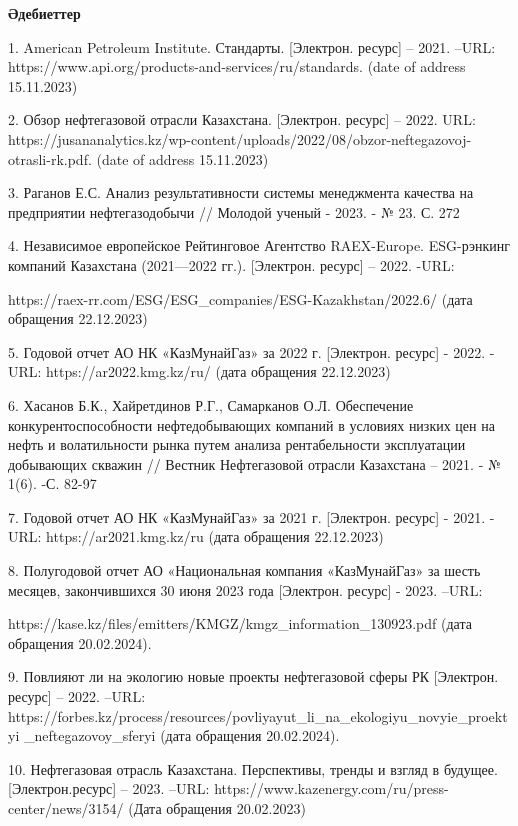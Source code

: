 \begin{center}
{\bfseries Әдебиеттер}
\end{center}

\begin{noparindent}
1. American Petroleum Institute. Стандарты. {[}Электрон. ресурс{]} --
2021. --URL: https://www.api.org/products-and-services/ru/standards.
(date of address 15.11.2023)

2. Обзор нефтегазовой отрасли Казахстана. {[}Электрон. ресурс{]} --
2022. URL:
https://jusananalytics.kz/wp-content/uploads/2022/08/obzor-neftegazovoj-otrasli-rk.pdf.
(date of address 15.11.2023)

3. Раганов Е.С. Анализ результативности системы менеджмента качества на
предприятии нефтегазодобычи // Молодой ученый - 2023. - № 23. С. 272

4. Независимое европейское Рейтинговое Агентство RAEX-Europe.
ESG-рэнкинг компаний Казахстана (2021---2022 гг.). {[}Электрон.
ресурс{]} -- 2022. -URL:

https://raex-rr.com/ESG/ESG\_companies/ESG-Kazakhstan/2022.6/ (дата
обращения 22.12.2023)

5. Годовой отчет АО НК «КазМунайГаз» за 2022 г. {[}Электрон. ресурс{]} -
2022. - URL: https://ar2022.kmg.kz/ru/ (дата обращения 22.12.2023)

6. Хасанов Б.К., Хайретдинов Р.Г., Самарканов О.Л. Обеспечение
конкурентоспособности нефтедобывающих компаний в условиях низких цен на
нефть и волатильности рынка путем анализа рентабельности эксплуатации
добывающих скважин // Вестник Нефтегазовой отрасли Казахстана -- 2021. -
№ 1(6). -С. 82-97

7. Годовой отчет АО НК «КазМунайГаз» за 2021 г. {[}Электрон. ресурс{]} -
2021. -URL: https://ar2021.kmg.kz/ru (дата обращения 22.12.2023)

8. Полугодовой отчет АО «Национальная компания «КазМунайГаз» за шесть
месяцев, закончившихся 30 июня 2023 года {[}Электрон. ресурс{]} - 2023.
--URL:

https://kase.kz/files/emitters/KMGZ/kmgz\_information\_130923.pdf
(дата обращения 20.02.2024).

9. Повлияют ли на экологию новые проекты нефтегазовой сферы РК
{[}Электрон. ресурс{]} -- 2022. --URL:
https://forbes.kz/process/resources/povliyayut\_li\_na\_ekologiyu\_novyie\_proektyi
\_neftegazovoy\_sferyi (дата обращения 20.02.2024).

10. Нефтегазовая отрасль Казахстана. Перспективы, тренды и взгляд в
будущее. {[}Электрон.ресурс{]} -- 2023. --URL:
https://www.kazenergy.com/ru/press-center/news/3154/ (Дата обращения
20.02.2023)


\end{noparindent}

